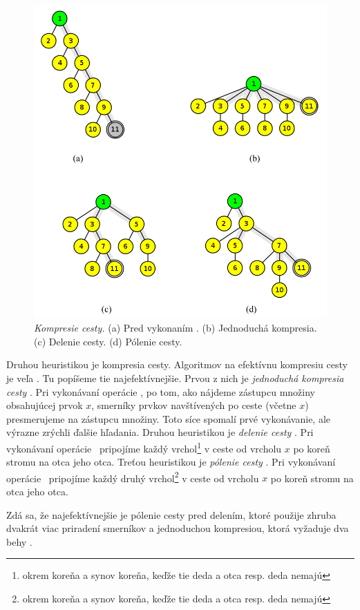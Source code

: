 \begin{figure}
\includegraphics[width=\columnwidth]{obrazky/komp.png}
\caption{\emph{Kompresie cesty.} (a) Pred vykonaním \find. (b) Jednoduchá 
kompresia. (c) Delenie cesty. (d) Pólenie cesty.} 
\label{img:komp} 
\end{figure}

Druhou heuristikou je kompresia cesty. Algoritmov na efektívnu kompresiu 
cesty je veľa \citep{paths2}. Tu popíšeme tie najefektívnejšie. Prvou z nich 
je \emph{jednoduchá kompresia cesty} \citep{comp1}. Pri vykonávaní 
operácie \find, po tom, 
ako nájdeme zástupcu množiny obsahujúcej prvok $x$, smerníky prvkov 
navštívených po ceste (včetne $x$) presmerujeme na zástupcu množiny. Toto 
síce spomalí prvé vykonávanie, ale výrazne zrýchli ďalšie hľadania. 
Druhou heuristikou je \emph{delenie cesty} \citep{comp2}. Pri vykonávaní 
operácie \find\ 
pripojíme každý vrchol\footnote{okrem koreňa a synov koreňa, 
keďže tie deda a otca resp. deda nemajú} v ceste od vrcholu $x$ po koreň stromu 
na otca jeho otca. 
Treťou heuristikou je \emph{pólenie cesty} \citep{comp2}. Pri vykonávaní 
operácie \find\ 
pripojíme každý druhý vrchol\footnote{okrem koreňa a synov koreňa, 
keďže tie deda a otca resp. deda nemajú} 
v ceste od vrcholu $x$ po koreň stromu na otca jeho otca. 

Zdá sa, že najefektívnejšie je pólenie cesty pred delením, ktoré 
použije zhruba dvakrát viac priradení smerníkov a jednoduchou kompresiou, 
ktorá vyžaduje dva behy \citep{galil}. 


